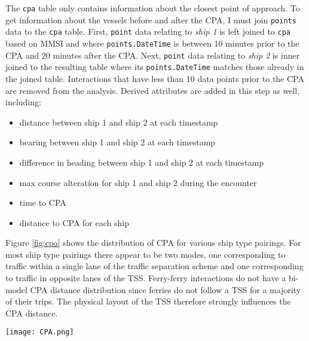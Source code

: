 \documentclass[twoside,symmetric,notoc]{tufte-book}
\begin{document}
\par{
The \texttt{cpa} table only contains information about the closest point of approach. To get information about the vessels before and after the CPA, I must join \texttt{points} data to the \texttt{cpa} table. First, \texttt{point} data relating to \textit{ship 1} is left joined to \texttt{cpa} based on MMSI and where \texttt{points.DateTime} is between 10 minutes prior to the CPA and 20 minutes after the CPA. Next, \texttt{point} data relating to \textit{ship 2} is inner joined to the resulting table where its \texttt{points.DateTime} matches those already in the joined table. Interactions that have less than 10 data points prior to the CPA are removed from the analysis. Derived attributes are added in this step as well, including:
\begin{itemize}
    \item distance between ship 1 and ship 2 at each timestamp
    \item bearing between ship 1 and ship 2 at each timestamp
    \item difference in heading between ship 1 and ship 2 at each timestamp
    \item max course alteration for ship 1 and ship 2 during the encounter
    \item time to CPA 
    \item distance to CPA for each ship
    \end{itemize}
Figure \ref{fig:cpa} shows the distribution of CPA for various ship type pairings. For most ship type pairings there appear to be two modes, one corresponding to traffic within a single lane of the traffic separation scheme and one corresponding to traffic in opposite lanes of the TSS. Ferry-ferry interactions do not have a bi-model CPA distance distribution since ferries do not follow a TSS for a majority of their trips. The physical layout of the TSS therefore strongly influences the CPA distance. 
\begin{figure*}
    \centering
    \texttt{[image: CPA.png]}
    \caption{The mode of CPA distance around 2.5-3 nautical miles corresponds to traffic in opposite lanes of the TSS.}
    \label{fig:cpa}
\end{figure*}
}
\end{document}
